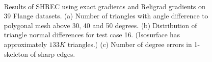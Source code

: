 \begin{figure}[tp]
\centering	

	\\
\caption{Results of SHREC using exact gradients and Religrad gradients on 39 Flange datasets. 
(a) Number of triangles with angle difference 
to polygonal mesh above 30, 40 and 50 degrees. 
(b) Distribution of triangle normal differences for test case 16.
(Isosurface has approximately $133K$ triangles.)
(c) Number of degree errors in 1-skeleton of sharp edges.
}

\label{fig:flangeAngle}


\end{figure}
